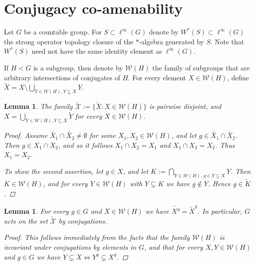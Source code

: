 \documentclass[11pt]{amsart}
\newtheorem{lem}[thm]{Lemma}
\theoremstyle{definition}
\newcommand{\cX}{{\mathcal X}}
\begin{document}
\section{Conjugacy co-amenability}



Let $G$ be a countable group. For $S\subset \ell^\infty(G)$ denote by $W^*(S)\subset \ell^\infty(G)$ the strong operator topology closure of the $*$-algebra generated by $S$. Note that $W^*(S)$ need not have the same identity element as $\ell^\infty(G)$. 


If $H<G$ is a subgroup, then denote by $\mathcal{W}(H)$ the family of subgroups that are arbitrary intersections of conjugates of $H$. For every element $X\in \mathcal{W}(H)$, define $\widetilde{X}= X\setminus \bigcup_{Y\in \mathcal{W}(H), Y\subsetneq X} Y$.  

\begin{lem}\label{lemma1}
The family $\widetilde{\cX}:=\{\widetilde{X} : X\in \mathcal{W}(H)\}$ is pairwise disjoint, and $X = \bigcup_{Y\in \mathcal{W}(H), Y\subseteq X}\widetilde{Y}$ for every $X\in \mathcal{W}(H)$.
\begin{proof}
Assume $\widetilde{X_1}\cap \widetilde{X_2} \neq\emptyset$ for some $X_1, X_2\in \mathcal{W}(H)$, and let $g\in \widetilde{X_1}\cap \widetilde{X_2}$. Then $g\in {X_1}\cap {X_2}$, and so it follows ${X_1}\cap {X_2}= X_1$ and ${X_1}\cap {X_2}= X_2$. Thus $X_1=X_2$.

To show the second assertion, let $g\in X$, and let $K:= \bigcap_{Y\in \mathcal{W}(H),\, g\in Y\subseteq X}Y$. Then $K\in \mathcal{W}(H)$, and for every $Y\in \mathcal{W}(H)$ with $Y\subsetneq K$ we have $g\notin Y$. Hence $g\in \widetilde{K}$.
\end{proof}
\end{lem} 


\begin{lem}
For every $g\in G$ and $X\in \mathcal{W}(H)$ we have $\widetilde{X^g} = \widetilde{X}^g$. In particular, $G$ acts on the set $\widetilde{\cX}$ by conjugations.
\begin{proof}
This follows immediately from the facts that the family $\mathcal{W}(H)$ is invariant under conjugations by elements in $G$, and that for every $X, Y\in \mathcal{W}(H)$ and $g\in G$ we have $Y\subsetneq X \iff Y^g\subsetneq X^g$.
\end{proof}
\end{lem} 
\end{document}
